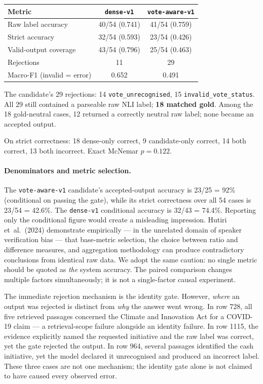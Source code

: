 \documentclass[10pt,a4paper]{article}
\begin{document}
\begin{center}\small
\begin{tabular}{@{}lcc@{}}
\toprule
Metric & \texttt{dense-v1} & \texttt{vote-aware-v1} \\
\midrule
Raw label accuracy & 40/54 (0.741) & 41/54 (0.759) \\
Strict accuracy & 32/54 (0.593) & 23/54 (0.426) \\
Valid-output coverage & 43/54 (0.796) & 25/54 (0.463) \\
Rejections & 11 & 29 \\
Macro-F1 (invalid = error) & 0.652 & 0.491 \\
\bottomrule
\end{tabular}
\end{center}

The candidate's 29 rejections: 14 \texttt{vote\_unrecognised}, 15 \texttt{invalid\_vote\_status}. All 29 still contained a parseable raw NLI label; \textbf{18 matched gold}. Among the 18 gold-neutral cases, 12 returned a correctly neutral raw label; none became an accepted output.

On strict correctness: 18 dense-only correct, 9 candidate-only correct, 14 both correct, 13 both incorrect. Exact McNemar $p = 0.122$.

\paragraph{Denominators and metric selection.}
The \texttt{vote-aware-v1} candidate's accepted-output accuracy is 23/25 = 92\% (conditional on passing the gate), while its strict correctness over all 54 cases is 23/54 = 42.6\%. The \texttt{dense-v1} conditional accuracy is 32/43 = 74.4\%. Reporting only the conditional figure would create a misleading impression. Hutiri et~al.~(2024) demonstrate empirically --- in the unrelated domain of speaker verification bias --- that base-metric selection, the choice between ratio and difference measures, and aggregation methodology can produce contradictory conclusions from identical raw data. We adopt the same caution: no single metric should be quoted as \emph{the} system accuracy. The paired comparison changes multiple factors simultaneously; it is not a single-factor causal experiment.

The immediate rejection mechanism is the identity gate. However, \emph{where} an output was rejected is distinct from \emph{why} the answer went wrong. In row 728, all five retrieved passages concerned the Climate and Innovation Act for a COVID-19 claim --- a retrieval-scope failure alongside an identity failure. In row 1115, the evidence explicitly named the requested initiative and the raw label was correct, yet the gate rejected the output. In row 964, several passages identified the cash initiative, yet the model declared it unrecognised and produced an incorrect label. These three cases are not one mechanism; the identity gate alone is not claimed to have caused every observed error.
\end{document}

